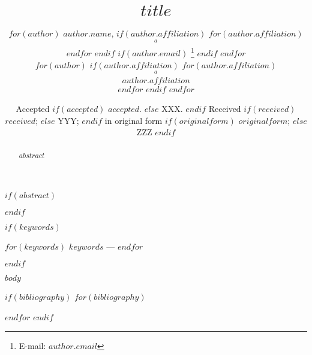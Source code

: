 \documentclass[a4paper,fleqn,usenatbib]{mnras}
\title[$shorttitle$]{$title$}
\author[$shortauthors$]{
$for(author)$
$author.name$,
$if(author.affiliation)$
$for(author.affiliation)$
$$^{a}$$
$endfor$
$endif$
$if(author.email)$
\thanks{E-mail: $author.email$}
$endif$
$endfor$
\\
$for(author)$
$if(author.affiliation)$
$for(author.affiliation)$
$$^{a}$$ $author.affiliation$\\
$endfor$
$endif$
$endfor$
}
\date{
Accepted 
$if(accepted)$
$accepted$.
$else$
XXX.
$endif$
Received
$if(received)$
$received$;
$else$
YYY;
$endif$
in original form
$if(originalform)$
$originalform$;
$else$
ZZZ
$endif$
}
\begin{document}
\label{firstpage}
\pagerange{\pageref{firstpage}--\pageref{lastpage}}
\maketitle

$if(abstract)$
\begin{abstract}
$abstract$
\end{abstract}
$endif$

$if(keywords)$
\begin{keywords}
$for(keywords)$
    $keywords$ --- 
$endfor$
\end{keywords}
$endif$

$body$

$if(bibliography)$
$for(bibliography)$

$endfor$
$endif$
\end{document}
